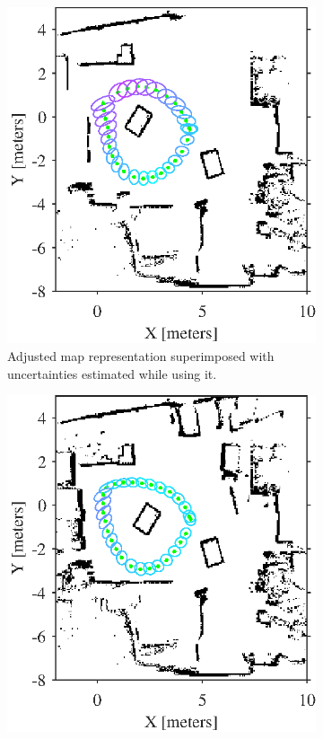 \begin{figure}[htbp]
    \centering
    \begin{subfigure}[t]{0.45\textwidth}
        \includegraphics[scale=1]{chapters/evaluation/figures/localization_on_adjusted_static_map}
        \caption{Adjusted map representation superimposed with uncertainties estimated while using it.}
        \label{fig:localization_on_adjusted}
    \end{subfigure}
    \hspace{2mm}
    \begin{subfigure}[t]{0.45\textwidth}
        \includegraphics[scale=1]{chapters/evaluation/figures/localization_on_ground_truth__map}

\end{subfigure}
\end{figure}
